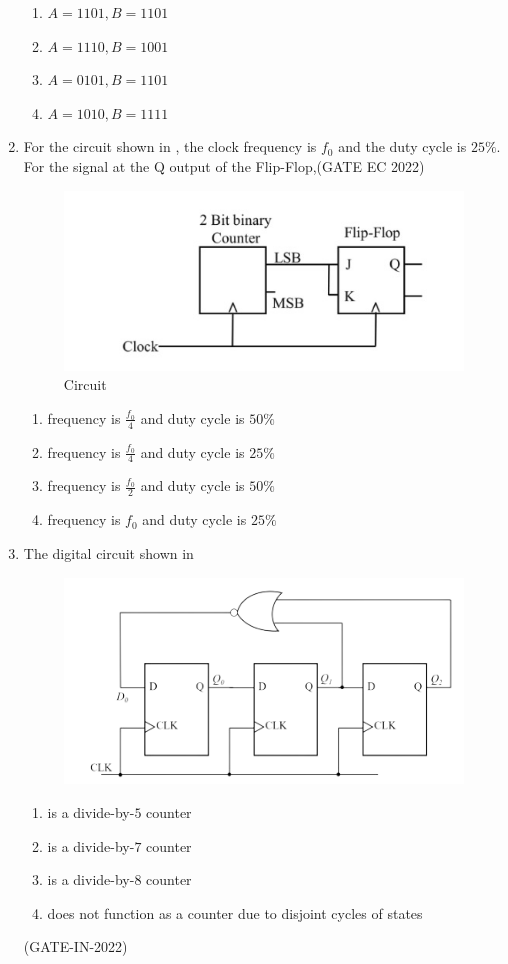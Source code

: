 \begin{enumerate}[label=\arabic*.,ref=\theenumi]
\begin{enumerate}
\item $A= 1101,B=1101$
\item $A=1110 ,B=1001$
\item $A=0101 ,B=1101$
\item $A=1010 ,B=1111$
\end {enumerate}
\item For the circuit shown
in
			,
	 the clock frequency is $f_0$ and the duty cycle is $25\%$. For the signal at the Q output of the Flip-Flop,\hfill(GATE EC 2022)
		\begin{figure}[H]
			\centering
			\includegraphics[width=0.75\columnwidth]{ide/7474/figs/gate_image_new.jpg}
			\caption{Circuit}
			\label{fig:new_gate}
		\end{figure}
			\begin{enumerate}
			\item frequency is $\frac{{f_0}}{4}$ and duty cycle is $50\%$
			\item frequency is $\frac{{f_0}}{4}$ and duty cycle is $25\%$
			\item frequency is $\frac{{f_0}}{2}$ and duty cycle is $50\%$
			\item frequency is ${f_0}$ and duty cycle is $25\%$
		\end{enumerate}
\item The digital circuit shown in 
\begin{figure}[H]
  \centering
  \includegraphics[width=0.75\columnwidth]{ide/7474/figs/GATEIN202236.png}
  \caption{}
  \label{fig:GATEIN202236.png}
\end{figure}
 \begin{enumerate}
 \item is a divide-by-$5$ counter
 \item is a divide-by-$7$ counter
 \item is a divide-by-$8$ counter
 \item does not function as a counter due to disjoint cycles of states 
\end{enumerate}
\hfill(GATE-IN-2022)


\end{enumerate}

